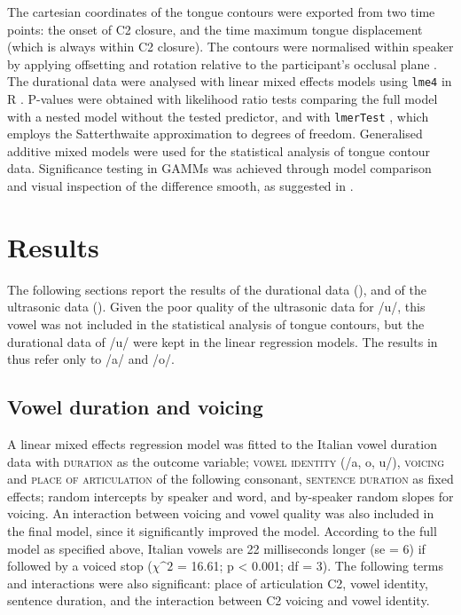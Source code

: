 \documentclass[authoryear, twocolumn]{elsarticle}
\begin{document}
The cartesian coordinates of the tongue contours were exported from two
time points: the onset of C2 closure, and the time maximum tongue
displacement (which is always within C2 closure). The contours were
normalised within speaker by applying offsetting and rotation relative
to the participant's occlusal plane \citep{scobbie2011}. The durational
data were analysed with linear mixed effects models using \texttt{lme4}
in R \citep{r-core-team2017, bates2015}. P-values were obtained with
likelihood ratio tests comparing the full model with a nested model
without the tested predictor, and with \texttt{lmerTest}
\citep{kuznetsova2016}, which employs the Satterthwaite approximation to
degrees of freedom. Generalised additive mixed models
\citep[GAMMs,][]{wood2006, zuur2012} were used for the statistical
analysis of tongue contour data. Significance testing in GAMMs was
achieved through model comparison and visual inspection of the
difference smooth, as suggested in \citep{soskuthy2017}.

\section{Results}\label{results}

The following sections report the results of the durational data
(), and of the ultrasonic data ().
Given the poor quality of the ultrasonic data for /u/, this vowel was
not included in the statistical analysis of tongue contours, but the
durational data of /u/ were kept in the linear regression models. The
results in  thus refer only to /a/ and /o/.

\subsection{Vowel duration and
voicing}\label{vowel-duration-and-voicing}

\label{s:vow-duration}

A linear mixed effects regression model was fitted to the Italian vowel
duration data with \textsc{duration} as the outcome variable;
\textsc{vowel identity} (/a, o, u/), \textsc{voicing} and
\textsc{place of articulation} of the following consonant,
\textsc{sentence duration} as fixed effects; random intercepts by
speaker and word, and by-speaker random slopes for voicing. An
interaction between voicing and vowel quality was also included in the
final model, since it significantly improved the model. According to the
full model as specified above, Italian vowels are 22 milliseconds longer
(se = 6) if followed by a voiced stop (\(\chi\^2\) = 16.61; p
\textless{} 0.001; df = 3). The following terms and interactions were
also significant: place of articulation C2, vowel identity, sentence
duration, and the interaction between C2 voicing and vowel identity.
\end{document}
